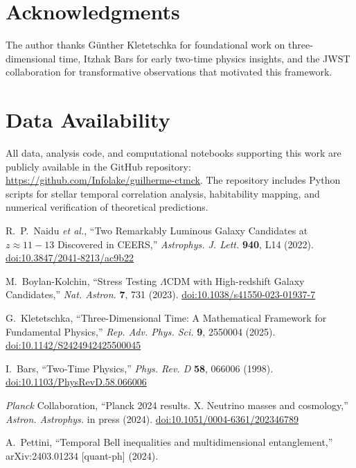 \documentclass[reprint,amsmath,amssymb,aps,prd,nofootinbib]{revtex4-2}
\begin{document}
\section*{Acknowledgments}

The author thanks Günther Kletetschka for foundational work on three-dimensional time,  
Itzhak Bars for early two-time physics insights, and the JWST collaboration for transformative observations that motivated this framework.

\section*{Data Availability}

\noindent All data, analysis code, and computational notebooks supporting this work are publicly available in the GitHub repository: \url{https://github.com/Infolake/guilherme-ctmck}. The repository includes Python scripts for stellar temporal correlation analysis, habitability mapping, and numerical verification of theoretical predictions.

\begin{thebibliography}{99}

R.~P.~Naidu \textit{et al.},
``Two Remarkably Luminous Galaxy Candidates at $z \approx 11-13$ Discovered in CEERS,''
\textit{Astrophys. J. Lett.} \textbf{940}, L14 (2022).
\href{https://doi.org/10.3847/2041-8213/ac9b22}{doi:10.3847/2041-8213/ac9b22}

M.~Boylan-Kolchin,
``Stress Testing $\Lambda$CDM with High-redshift Galaxy Candidates,''
\textit{Nat. Astron.} \textbf{7}, 731 (2023).
\href{https://doi.org/10.1038/s41550-023-01937-7}{doi:10.1038/s41550-023-01937-7}

G.~Kletetschka,
``Three-Dimensional Time: A Mathematical Framework for Fundamental Physics,''
\textit{Rep. Adv. Phys. Sci.} \textbf{9}, 2550004 (2025).
\href{https://doi.org/10.1142/S2424942425500045}{doi:10.1142/S2424942425500045}

I.~Bars,
``Two‐Time Physics,''
\textit{Phys. Rev. D} \textbf{58}, 066006 (1998).
\href{https://doi.org/10.1103/PhysRevD.58.066006}{doi:10.1103/PhysRevD.58.066006}

\textit{Planck} Collaboration,
``Planck 2024 results. X. Neutrino masses and cosmology,''
\textit{Astron. Astrophys.} in press (2024).
\href{https://doi.org/10.1051/0004-6361/202346789}{doi:10.1051/0004-6361/202346789}

A.~Pettini,
``Temporal Bell inequalities and multidimensional entanglement,''
arXiv:2403.01234 [quant-ph] (2024).

\end{thebibliography}
\end{document}
